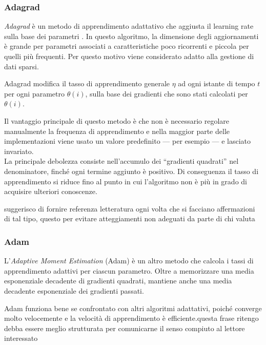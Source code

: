 \subsubsection{Adagrad}
\label{subsubsec:adagrad}

\emph{Adagrad} è un metodo di apprendimento adattativo che aggiusta il learning rate sulla base dei parametri \cite{duchi2011adaptive} .
In questo algoritmo, la dimensione degli aggiornamenti è grande per parametri associati a caratteristiche poco ricorrenti e piccola per quelli più frequenti. Per questo motivo viene considerato adatto alla gestione di dati sparsi.

Adagrad modifica il tasso di apprendimento generale $\eta$ ad ogni istante di tempo $t$ per ogni parametro $\theta(i)$, sulla base dei gradienti che sono stati calcolati per $\theta(i)$.

Il vantaggio principale di questo metodo è che non è necessario regolare manualmente la frequenza di apprendimento e nella maggior parte delle implementazioni viene usato un valore predefinito --- per esempio  --- e lasciato invariato.\\
La principale debolezza consiste nell'accumulo dei ``gradienti quadrati'' nel denominatore, finché ogni termine aggiunto è positivo. Di conseguenza il tasso di apprendimento si riduce fino al punto in cui l'algoritmo non è più in grado di acquisire ulteriori conoscenze. 

{\color{red} suggerisco di fornire referenza letteratura ogni volta che si facciano affermazioni di tal tipo, questo per evitare atteggiamenti non adeguati da parte di chi valuta}

\subsubsection{Adam}
\label{subsubsec:adam}

L'\emph{Adaptive Moment Estimation} (Adam) è un altro metodo che calcola i tassi di apprendimento adattivi per ciascun parametro. Oltre a memorizzare una media esponenziale decadente di gradienti quadrati, mantiene anche una media decadente esponenziale dei gradienti passati.

{\color{blue}Adam funziona bene se confrontato con altri algoritmi adattativi, poiché converge molto velocemente e la velocità di apprendimento è efficiente.}{\color{red}questa frase ritengo debba essere meglio strutturata per comunicarne il senso compiuto al lettore interessato}

